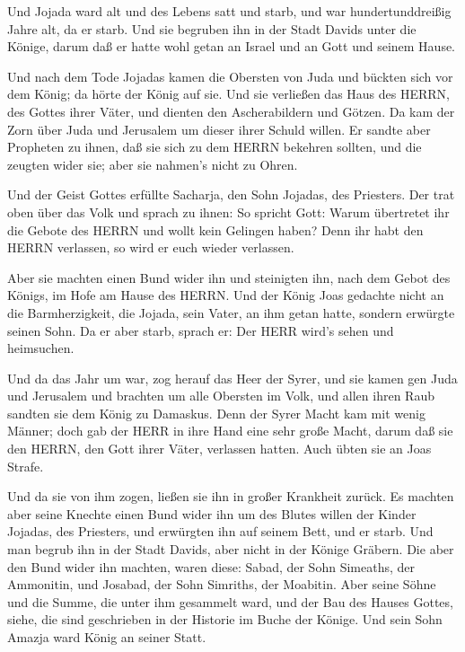  Und Jojada ward alt und des Lebens satt und starb, und war
hundertunddreißig Jahre alt, da er starb.  Und sie begruben
ihn in der Stadt Davids unter die Könige, darum daß er hatte wohl getan
an Israel und an Gott und seinem Hause.

 Und nach dem Tode Jojadas kamen die Obersten von Juda und
bückten sich vor dem König; da hörte der König auf sie. 
Und sie verließen das Haus des HERRN, des Gottes ihrer Väter, und
dienten den Ascherabildern und Götzen. Da kam der Zorn über Juda und
Jerusalem um dieser ihrer Schuld willen.  Er sandte aber
Propheten zu ihnen, daß sie sich zu dem HERRN bekehren sollten, und die
zeugten wider sie; aber sie nahmen's nicht zu Ohren.

 Und der Geist Gottes erfüllte Sacharja, den Sohn Jojadas,
des Priesters. Der trat oben über das Volk und sprach zu ihnen: So
spricht Gott: Warum übertretet ihr die Gebote des HERRN und wollt kein
Gelingen haben? Denn ihr habt den HERRN verlassen, so wird er euch
wieder verlassen.

 Aber sie machten einen Bund wider ihn und steinigten ihn,
nach dem Gebot des Königs, im Hofe am Hause des HERRN.  Und
der König Joas gedachte nicht an die Barmherzigkeit, die Jojada, sein
Vater, an ihm getan hatte, sondern erwürgte seinen Sohn. Da er aber
starb, sprach er: Der HERR wird's sehen und heimsuchen.

 Und da das Jahr um war, zog herauf das Heer der Syrer, und
sie kamen gen Juda und Jerusalem und brachten um alle Obersten im Volk,
und allen ihren Raub sandten sie dem König zu Damaskus. 
Denn der Syrer Macht kam mit wenig Männer; doch gab der HERR in ihre
Hand eine sehr große Macht, darum daß sie den HERRN, den Gott ihrer
Väter, verlassen hatten. Auch übten sie an Joas Strafe.

 Und da sie von ihm zogen, ließen sie ihn in großer
Krankheit zurück. Es machten aber seine Knechte einen Bund wider ihn um
des Blutes willen der Kinder Jojadas, des Priesters, und erwürgten ihn
auf seinem Bett, und er starb. Und man begrub ihn in der Stadt Davids,
aber nicht in der Könige Gräbern.  Die aber den Bund wider
ihn machten, waren diese: Sabad, der Sohn Simeaths, der Ammonitin, und
Josabad, der Sohn Simriths, der Moabitin.  Aber seine Söhne
und die Summe, die unter ihm gesammelt ward, und der Bau des Hauses
Gottes, siehe, die sind geschrieben in der Historie im Buche der Könige.
Und sein Sohn Amazja ward König an seiner Statt.

